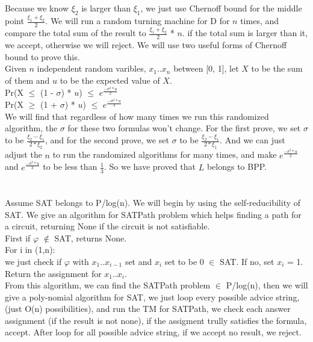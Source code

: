 \documentclass[11pt]{article}
\begin{document}
\part{}
Because we know $\xi_{2}$ is larger than $\xi_{1}$, we just use Chernoff bound for the middle point $\frac{\xi_{1} + \xi_{2}}{2}$.
We will run a random turning machine for D for $n$ times, and compare the total sum of the result to $\frac{\xi_{1} + \xi_{2}}{2}$ * $n$. if the total sum is larger than it, we accept, otherwise we will reject. We will use two useful forms of Chernoff bound to prove this. \\
Given $n$ independent random varibles, $x_{1}$..$x_{n}$ between [0, 1], let $X$ to be the sum of them and $u$ to be the expected value of $X$. \\
Pr(X $\leq$ (1 - $\sigma$) * $u$) $\leq$ $e^{\frac{-\sigma^{2}*u}{2}}$ \\
Pr(X $\geq$ (1 + $\sigma$) * $u$) $\leq$ $e^{\frac{-\sigma^{2}*u}{3}}$ \\
We will find that regardless of how many times we run this randomized algorithm, the $\sigma$ for these two formulas won't change. For the first prove, we set $\sigma$ to be $\frac{\xi_{2} - \xi_{1}}{2*\xi_{2}}$, and for the second prove, we set $\sigma$ to be $\frac{\xi_{2} - \xi_{1}}{2*\xi_{1}}$. And we can just adjust the $n$ to run the randomized algorithms for many times, and make $e^{\frac{-\sigma^{2}*u}{2}}$ and $e^{\frac{-\sigma^{2}*u}{3}}$ to be less than $\frac{1}{3}$. So we have proved that $L$ belongs to BPP.
\part{}
Assume SAT belongs to P/log(n). We will begin by using the self-reducibility of SAT. We give an algorithm for SATPath problem which helps finding a path for a circuit, returning None if the circuit is not satisfiable.\\
First if $\varphi$ $\notin$ SAT, returns None. \\
For i in (1,n): \\
	we just check if $\varphi$ with $x_{1}..x_{i-1}$ set and $x_{i}$ set to be 0 $\in$ SAT. If no, set $x_{i}$ = 1. \\
Return the assignment for $x_{1}..x_{i}$. \\
From this algorithm, we can find the SATPath problem $\in$ P/log(n), then we will give a poly-nomial algorithm for SAT, we just loop every possible advice string, (just O(n) possibilities), and run the TM for SATPath, we check each answer assignment (if the result is not none), if the assigment trully satisfies the formula, accept. After loop for all possible advice string, if we accept no result, we reject.
\end{document}
